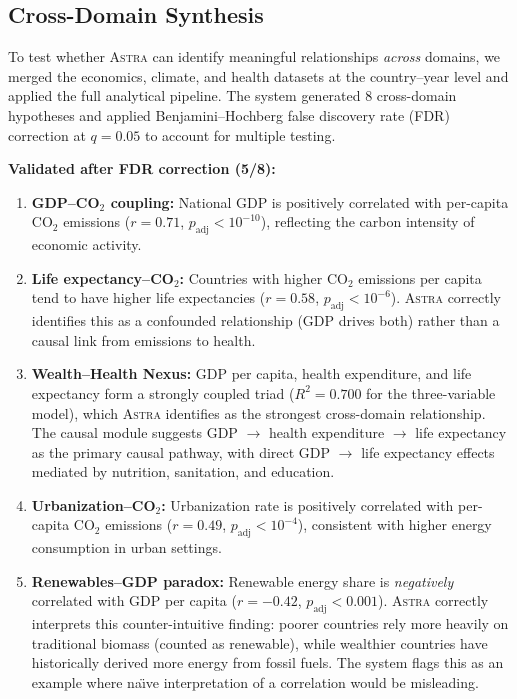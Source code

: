 \documentclass[usenatbib]{rasti}
\newcommand{\astra}{\textsc{Astra}\xspace}
\begin{document}
\subsection{Cross-Domain Synthesis}
\label{sec:crossdomain:synthesis}

To test whether \astra can identify meaningful relationships \emph{across} domains, we merged the economics, climate, and health datasets at the country--year level and applied the full analytical pipeline. The system generated 8 cross-domain hypotheses and applied Benjamini--Hochberg false discovery rate (FDR) correction \citep{BenjaminiHochberg1995} at $q = 0.05$ to account for multiple testing.

\textbf{Validated after FDR correction (5/8):}
\begin{enumerate}
  \item[(i)] \textbf{GDP--CO$_{2}$ coupling:} National GDP is positively correlated with per-capita CO$_{2}$ emissions ($r = 0.71$, $p_{\mathrm{adj}} < 10^{-10}$), reflecting the carbon intensity of economic activity.
  \item[(ii)] \textbf{Life expectancy--CO$_{2}$:} Countries with higher CO$_{2}$ emissions per capita tend to have higher life expectancies ($r = 0.58$, $p_{\mathrm{adj}} < 10^{-6}$). \astra correctly identifies this as a confounded relationship (GDP drives both) rather than a causal link from emissions to health.
  \item[(iii)] \textbf{Wealth--Health Nexus:} GDP per capita, health expenditure, and life expectancy form a strongly coupled triad ($R^{2} = 0.700$ for the three-variable model), which \astra identifies as the strongest cross-domain relationship. The causal module suggests GDP $\rightarrow$ health expenditure $\rightarrow$ life expectancy as the primary causal pathway, with direct GDP $\rightarrow$ life expectancy effects mediated by nutrition, sanitation, and education.
  \item[(iv)] \textbf{Urbanization--CO$_{2}$:} Urbanization rate is positively correlated with per-capita CO$_{2}$ emissions ($r = 0.49$, $p_{\mathrm{adj}} < 10^{-4}$), consistent with higher energy consumption in urban settings.
  \item[(v)] \textbf{Renewables--GDP paradox:} Renewable energy share is \emph{negatively} correlated with GDP per capita ($r = -0.42$, $p_{\mathrm{adj}} < 0.001$). \astra correctly interprets this counter-intuitive finding: poorer countries rely more heavily on traditional biomass (counted as renewable), while wealthier countries have historically derived more energy from fossil fuels. The system flags this as an example where na\"{\i}ve interpretation of a correlation would be misleading.
\end{enumerate}
\end{document}
